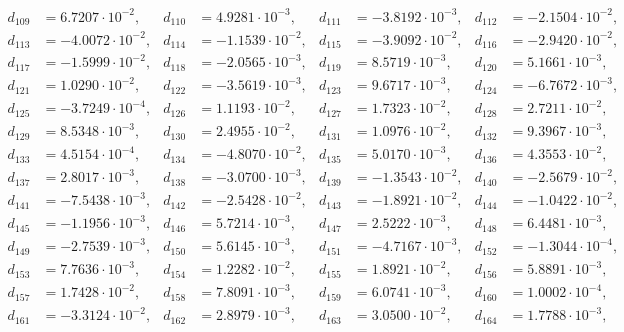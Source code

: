 \begin{align*}
d_{ 109 } &= 6.7207 \cdot 10^{ -2 }, & d_{ 110 } &= 4.9281 \cdot 10^{ -3 }, & d_{ 111 } &= -3.8192 \cdot 10^{ -3 }, & d_{ 112 } &= -2.1504 \cdot 10^{ -2 },\\ 
d_{ 113 } &= -4.0072 \cdot 10^{ -2 }, & d_{ 114 } &= -1.1539 \cdot 10^{ -2 }, & d_{ 115 } &= -3.9092 \cdot 10^{ -2 }, & d_{ 116 } &= -2.9420 \cdot 10^{ -2 },\\ 
d_{ 117 } &= -1.5999 \cdot 10^{ -2 }, & d_{ 118 } &= -2.0565 \cdot 10^{ -3 }, & d_{ 119 } &= 8.5719 \cdot 10^{ -3 }, & d_{ 120 } &= 5.1661 \cdot 10^{ -3 },\\ 
d_{ 121 } &= 1.0290 \cdot 10^{ -2 }, & d_{ 122 } &= -3.5619 \cdot 10^{ -3 }, & d_{ 123 } &= 9.6717 \cdot 10^{ -3 }, & d_{ 124 } &= -6.7672 \cdot 10^{ -3 },\\ 
d_{ 125 } &= -3.7249 \cdot 10^{ -4 }, & d_{ 126 } &= 1.1193 \cdot 10^{ -2 }, & d_{ 127 } &= 1.7323 \cdot 10^{ -2 }, & d_{ 128 } &= 2.7211 \cdot 10^{ -2 },\\ 
d_{ 129 } &= 8.5348 \cdot 10^{ -3 }, & d_{ 130 } &= 2.4955 \cdot 10^{ -2 }, & d_{ 131 } &= 1.0976 \cdot 10^{ -2 }, & d_{ 132 } &= 9.3967 \cdot 10^{ -3 },\\ 
d_{ 133 } &= 4.5154 \cdot 10^{ -4 }, & d_{ 134 } &= -4.8070 \cdot 10^{ -2 }, & d_{ 135 } &= 5.0170 \cdot 10^{ -3 }, & d_{ 136 } &= 4.3553 \cdot 10^{ -2 },\\ 
d_{ 137 } &= 2.8017 \cdot 10^{ -3 }, & d_{ 138 } &= -3.0700 \cdot 10^{ -3 }, & d_{ 139 } &= -1.3543 \cdot 10^{ -2 }, & d_{ 140 } &= -2.5679 \cdot 10^{ -2 },\\ 
d_{ 141 } &= -7.5438 \cdot 10^{ -3 }, & d_{ 142 } &= -2.5428 \cdot 10^{ -2 }, & d_{ 143 } &= -1.8921 \cdot 10^{ -2 }, & d_{ 144 } &= -1.0422 \cdot 10^{ -2 },\\ 
d_{ 145 } &= -1.1956 \cdot 10^{ -3 }, & d_{ 146 } &= 5.7214 \cdot 10^{ -3 }, & d_{ 147 } &= 2.5222 \cdot 10^{ -3 }, & d_{ 148 } &= 6.4481 \cdot 10^{ -3 },\\ 
d_{ 149 } &= -2.7539 \cdot 10^{ -3 }, & d_{ 150 } &= 5.6145 \cdot 10^{ -3 }, & d_{ 151 } &= -4.7167 \cdot 10^{ -3 }, & d_{ 152 } &= -1.3044 \cdot 10^{ -4 },\\ 
d_{ 153 } &= 7.7636 \cdot 10^{ -3 }, & d_{ 154 } &= 1.2282 \cdot 10^{ -2 }, & d_{ 155 } &= 1.8921 \cdot 10^{ -2 }, & d_{ 156 } &= 5.8891 \cdot 10^{ -3 },\\ 
d_{ 157 } &= 1.7428 \cdot 10^{ -2 }, & d_{ 158 } &= 7.8091 \cdot 10^{ -3 }, & d_{ 159 } &= 6.0741 \cdot 10^{ -3 }, & d_{ 160 } &= 1.0002 \cdot 10^{ -4 },\\ 
d_{ 161 } &= -3.3124 \cdot 10^{ -2 }, & d_{ 162 } &= 2.8979 \cdot 10^{ -3 }, & d_{ 163 } &= 3.0500 \cdot 10^{ -2 }, & d_{ 164 } &= 1.7788 \cdot 10^{ -3 },\\ 

\end{align*}

